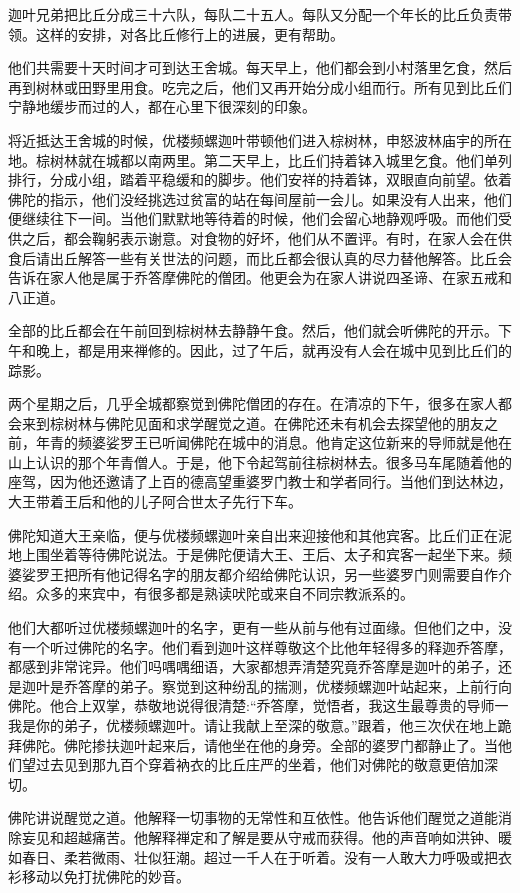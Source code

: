 \documentclass[12pt,twoside,openany]{book}
\begin{document}
迦叶兄弟把比丘分成三十六队，每队二十五人。每队又分配一个年长的比丘负责带领。这样的安排，对各比丘修行上的进展，更有帮助。

他们共需要十天时间才可到达王舍城。每天早上，他们都会到小村落里乞食，然后再到树林或田野里用食。吃完之后，他们又再开始分成小组而行。所有见到比丘们宁静地缓步而过的人，都在心里下很深刻的印象。

将近抵达王舍城的时候，优楼频螺迦叶带顿他们进入棕树林，申怒波林庙宇的所在地。棕树林就在城都以南两里。第二天早上，比丘们持着钵入城里乞食。他们单列排行，分成小组，踏着平稳缓和的脚步。他们安祥的持着钵，双眼直向前望。依着佛陀的指示，他们没经挑选过贫富的站在每间屋前一会儿。如果没有人出来，他们便继续往下一间。当他们默默地等待着的时候，他们会留心地静观呼吸。而他们受供之后，都会鞠躬表示谢意。对食物的好坏，他们从不置评。有时，在家人会在供食后请出丘解答一些有关世法的问题，而比丘都会很认真的尽力替他解答。比丘会告诉在家人他是属于乔答摩佛陀的僧团。他更会为在家人讲说四圣谛、在家五戒和八正道。

全部的比丘都会在午前回到棕树林去静静午食。然后，他们就会听佛陀的开示。下午和晚上，都是用来禅修的。因此，过了午后，就再没有人会在城中见到比丘们的踪影。

两个星期之后，几乎全城都察觉到佛陀僧团的存在。在清凉的下午，很多在家人都会来到棕树林与佛陀见面和求学醒觉之道。在佛陀还未有机会去探望他的朋友之前，年青的频婆娑罗王已听闻佛陀在城中的消息。他肯定这位新来的导师就是他在山上认识的那个年青僧人。于是，他下令起驾前往棕树林去。很多马车尾随着他的座驾，因为他还邀请了上百的德高望重婆罗门教士和学者同行。当他们到达林边，大王带着王后和他的儿子阿合世太子先行下车。

佛陀知道大王亲临，便与优楼频螺迦叶亲自出来迎接他和其他宾客。比丘们正在泥地上围坐着等待佛陀说法。于是佛陀便请大王、王后、太子和宾客一起坐下来。频婆娑罗王把所有他记得名字的朋友都介绍给佛陀认识，另一些婆罗门则需要自作介绍。众多的来宾中，有很多都是熟读吠陀或来自不同宗教派系的。

他们大都听过优楼频螺迦叶的名字，更有一些从前与他有过面缘。但他们之中，没有一个听过佛陀的名字。他们看到迦叶这样尊敬这个比他年轻得多的释迦乔答摩，都感到非常诧异。他们吗喁喁细语，大家都想弄清楚究竟乔答摩是迦叶的弟子，还是迦叶是乔答摩的弟子。察觉到这种纷乱的揣测，优楼频螺迦叶站起来，上前行向佛陀。他合上双掌，恭敬地说得很清楚:“乔答摩，觉悟者，我这生最尊贵的导师一我是你的弟子，优楼频螺迦叶。请让我献上至深的敬意。”跟着，他三次伏在地上跪拜佛陀。佛陀掺扶迦叶起来后，请他坐在他的身旁。全部的婆罗门都静止了。当他们望过去见到那九百个穿着衲衣的比丘庄严的坐着，他们对佛陀的敬意更倍加深切。

佛陀讲说醒觉之道。他解释一切事物的无常性和互依性。他告诉他们醒觉之道能消除妄见和超越痛苦。他解释禅定和了解是要从守戒而获得。他的声音响如洪钟、暖如春日、柔若微雨、壮似狂潮。超过一千人在于听着。没有一人敢大力呼吸或把衣衫移动以免打扰佛陀的妙音。
\end{document}
